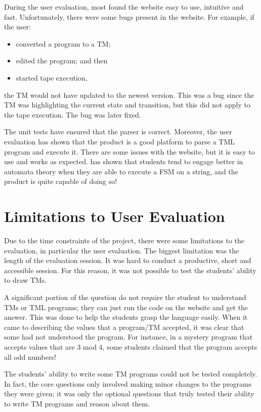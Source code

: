 During the user evaluation, most found the website easy to use, intuitive and fast. Unfortunately, there were some bugs present in the website. For example, if the user:
\begin{itemize}
    \item converted a program to a TM;
    \item edited the program; and then
    \item started tape execution,
\end{itemize}
the TM would not have updated to the newest version. This was a bug since the TM was highlighting the current state and transition, but this did not apply to the tape execution. The bug was later fixed.

The unit tests have ensured that the parser is correct. Moreover, the user evaluation has shown that the product is a good platform to parse a TML program and execute it. There are some issues with the website, but it is easy to use and works as expected. \citet{rodger2009increasing} has shown that students tend to engage better in automata theory when they are able to execute a FSM on a string, and the product is quite capable of doing so!

\section{Limitations to User Evaluation}
Due to the time constraints of the project, there were some limitations to the evaluation, in particular the user evaluation. The biggest limitation was the length of the evaluation session. It was hard to conduct a productive, short and accessible session. For this reason, it was not possible to test the students' ability to draw TMs. 

A significant portion of the question do not require the student to understand TMs or TML programs; they can just run the code on the website and get the answer. This was done to help the students grasp the language easily. When it came to describing the values that a program/TM accepted, it was clear that some had not understood the program. For instance, in a mystery program that accepts values that are 3 mod 4, some students claimed that the program accepts all odd numbers!

The students' ability to write some TM programs could not be tested completely. In fact, the core questions only involved making minor changes to the programs they were given; it was only the optional questions that truly tested their ability to write TM programs and reason about them.

